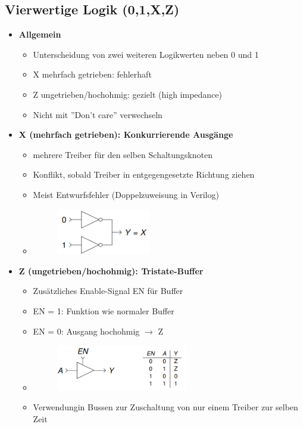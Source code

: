 \documentclass[11pt,a4paper]{article}
\begin{document}
\subsection{Vierwertige Logik (0,1,X,Z)}
\begin{itemize}

\item \textbf{Allgemein}
	\begin{itemize}
	\item Unterscheidung von zwei weiteren Logikwerten neben 0 und 1
	\item X mehrfach getrieben: fehlerhaft
	\item Z ungetrieben/hochohmig: gezielt (high impedance)
	\item Nicht mit ''Don't care'' verwechseln
	\end{itemize}

\item \textbf{X (mehrfach getrieben): Konkurrierende Ausgänge}
	\begin{itemize}
	\item mehrere Treiber für den selben Schaltungsknoten
	\item Konflikt, sobald Treiber in entgegengesetzte Richtung ziehen
	\item Meist Entwurfsfehler (Doppelzuweisung in Verilog)
	\item[] \begin{figure}[H]
				\begin{center}
				\includegraphics[height=2cm]{mehrx}
				\end{center}
			\end{figure}
	\end{itemize}
	
\item \textbf{Z (ungetrieben/hochohmig): Tristate-Buffer}
	\begin{itemize}
	\item Zusätzliches Enable-Signal EN für Buffer
	\item EN = 1: Funktion wie normaler Buffer
	\item EN = 0: Ausgang hochohmig $\rightarrow$ Z
	\item[] \begin{figure}[H]
				\begin{center}
				\includegraphics[height=2cm]{mehrz}
				\end{center}
			\end{figure}
	\item Verwendungin Bussen zur Zuschaltung von nur einem Treiber zur selben Zeit
	\end{itemize}
	

\end{itemize}
\end{document}
